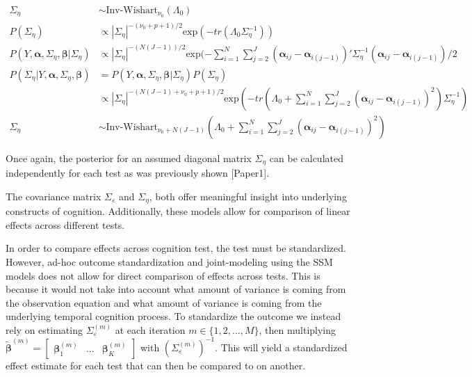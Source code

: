 \documentclass[
]{article}
\begin{document}
\begin{equation*}
\begin{aligned}
\Sigma_\eta &\sim \text{Inv-Wishart}_{\nu_0}(\Lambda_0)\\
P(\Sigma_\eta) &\propto |\Sigma_\eta|^{-(\nu_0+p+1)/2}\text{exp}(-tr(\Lambda_0\Sigma_\eta^{-1}))\\
P(Y, \boldsymbol{\alpha}, \Sigma_\eta, \boldsymbol{\beta}|\Sigma_\eta) &\propto |\Sigma_\eta|^{-(N(J-1))/2}\text{exp}(-\sum^N_{i = 1}\sum^{J}_{j= 2} (\boldsymbol{\alpha}_{ij} - \boldsymbol{\alpha}_{i(j-1)})'\Sigma_\eta^{-1}(\boldsymbol{\alpha}_{ij} - \boldsymbol{\alpha}_{i(j-1)})/2 \\
P(\Sigma_\eta|Y, \boldsymbol{\alpha}, \Sigma_\eta, \boldsymbol{\beta}) & = P(Y, \boldsymbol{\alpha}, \Sigma_\eta, \boldsymbol{\beta}|\Sigma_\eta)P(\Sigma_\eta) \\ &\propto |\Sigma_\eta|^{-(N(J-1) +\nu_0+p+1)/2}\text{exp}(-tr(\Lambda_0 + \sum^N_{i = 1}\sum^J_{j= 2} (\boldsymbol{\alpha}_{ij} - \boldsymbol{\alpha}_{i(j-1)})^2)\Sigma_\eta^{-1})\\
\Sigma_\eta & \sim \text{Inv-Wishart}_{\nu_0 + N(J-1)}(\Lambda_0+\sum^N_{i = 1}\sum^J_{j= 2} (\boldsymbol{\alpha}_{ij} - \boldsymbol{\alpha}_{i(j-1)})^2)
\end{aligned}
\end{equation*}

Once again, the posterior for an assumed diagonal matrix \(\Sigma_\eta\) can be calculated independently for each test as was previously shown {[}Paper1{]}.

The covariance matrix \(\Sigma_\varepsilon\) and \(\Sigma_\eta\), both offer meaningful insight into underlying constructs of cognition. Additionally, these models allow for comparison of linear effects across different tests.

In order to compare effects across cognition test, the test must be standardized. However, ad-hoc outcome standardization and joint-modeling using the SSM models does not allow for direct comparison of effects across tests. This is because it would not take into account what amount of variance is coming from the observation equation and what amount of variance is coming from the underlying temporal cognition process. To standardize the outcome we instead rely on estimating \(\Sigma_\varepsilon^{(m)}\) at each iteration \(m \in \{1, 2, ..., M\}\), then multiplying \(\tilde{\boldsymbol{\beta}}^{(m)} = \begin{bmatrix}\boldsymbol{\beta}_1^{(m)} & ... & \boldsymbol{\beta}_K^{(m)}\end{bmatrix}\) with \((\Sigma_\varepsilon^{(m)})^{-1}\). This will yield a standardized effect estimate for each test that can then be compared to on another.
\end{document}

